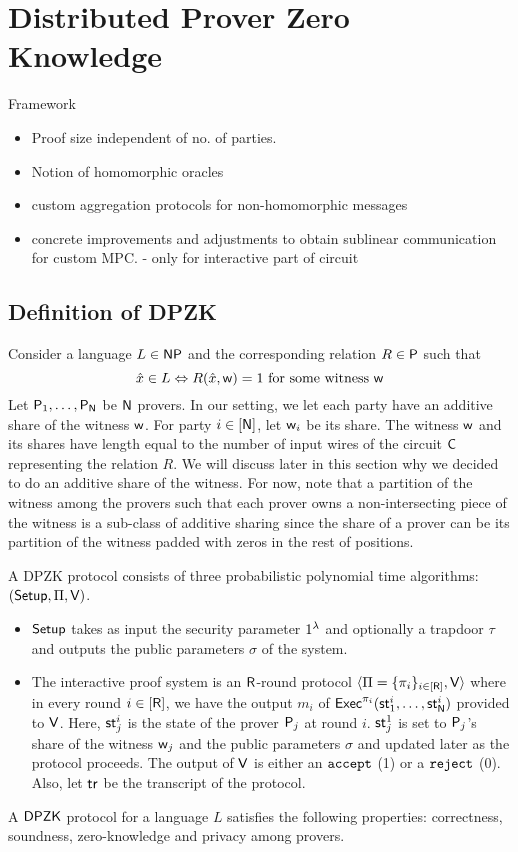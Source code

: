 \section{Distributed Prover Zero Knowledge}
Framework
\begin{itemize}
\item Proof size independent of no. of parties.
\item Notion of homomorphic oracles
\item custom aggregation protocols for non-homomorphic messages
\item concrete improvements and adjustments to obtain sublinear communication for custom MPC. - only for interactive part of circuit
\end{itemize}

\subsection{Definition of DPZK}
Consider a language $L \in \mathsf{NP}$ and the corresponding relation $R \in \mathsf{P}$ such that
\[
\hat{x} \in L \Leftrightarrow R(\hat{x}, \mathsf{w})=1 \text{ for some witness } \mathsf{w}
\]
Let $\mathsf{P}_1, \ldots, \mathsf{P}_{\mathsf{N}}$ be $\mathsf{N}$ provers. In our setting, we let each party have an additive share of the witness $\mathsf{w}$. For party $i \in [\mathsf{N}]$, let $\mathsf{w}_i$ be its share.  The witness $\mathsf{w}$ and its shares have length equal to the number of input wires of the circuit $\mathsf{C}$ representing the relation $R$. We will discuss later in this section why we decided to do an additive share of the witness. For now, note that a partition of the witness among the provers such that each prover owns a non-intersecting piece of the witness is a sub-class of additive sharing since the share of a prover can be its partition of the witness padded with zeros in the rest of positions.


A DPZK protocol consists of three probabilistic polynomial time algorithms: $(\mathsf{Setup}, \Pi, \mathsf{V})$. 
\begin{itemize}
\item $\mathsf{Setup}$ takes as input the security parameter $1^{\lambda}$ and optionally a trapdoor $\tau$ and outputs the public parameters $\sigma$ of the system.
\item The interactive proof system is an $\mathsf{R}$-round protocol $\langle \Pi = \{\pi_i\}_{i \in [\mathsf{R}]}, \mathsf{V} \rangle$ where in every round $i \in [\mathsf{R}]$, we have the output $m_i$ of $\mathsf{Exec}^{\pi_i}(\mathsf{st}^i_1, \ldots, \mathsf{st}^i_{\mathsf{N}})$ provided to $\mathsf{V}$. Here, $\mathsf{st}^i_j$ is the state of the prover $\mathsf{P}_j$ at round $i$. $\mathsf{st}^1_j$ is set to $\mathsf{P}_j$'s share of the witness $\mathsf{w}_j$ and the public parameters $\sigma$ and updated later as the protocol proceeds. The output of $\mathsf{V}$ is either an $\tt accept$ (1) or a $\tt{reject}$ (0). Also, let $\mathsf{tr}$ be the transcript of the protocol.
\end{itemize}
A $\mathsf{DPZK}$ protocol for a language $L$ satisfies the following properties: 
correctness, soundness, zero-knowledge and privacy among provers.
